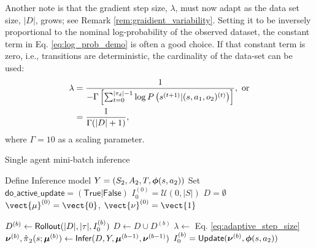 Another note is that the gradient step size, $\lambda$, must now adapt as the data set size, $|D|$, grows; see Remark
\ref{rem:graidient_variability}. Setting it to be inversely proportional to the nominal log-probability of the observed
dataset, the constant term in Eq. \ref{eq:log_prob_demo} is often a good choice. If that constant term is zero, i.e.,
transitions are deterministic, the cardinality of the data-set can be used:
\begin{equation}\label{eq:adaptive_step_size}
    \begin{aligned}
        \lambda & = \frac{1}{-\Gamma \left[ \sum_{t=0}^{\lvert\tau_d\rvert-1}
                                            \log P \left(s^{(t+1)}|(s, a_1, o_2)^{(t)}\right)\right]},\ \text{or}\\
                & = \frac{1}{\Gamma(|D|+1)},
    \end{aligned}
\end{equation}
where $\Gamma=10$ as a scaling parameter.

        \begin{algorithm}
        \caption{Single agent mini-batch inference}
        \label{alg:single_agent_batch}
        \begin{algorithmic}[1]
                \State Define Inference model $Y=(S_2,A_2,T,\boldsymbol{\mathbb{\phi}}(s, a_2))$
                \State Set $\mathsf{do\_active\_update}=(\mathsf{True}|\mathsf{False})$
                \State $I_0^{(0)} = \mathcal{U}(0,|S|)$
                \State $D=\emptyset$ 
                \State $\vect{\mu}^{(0)} = \vect{0}$, $\vect{\nu}^{(0)} = \vect{1}$

                \State $D^{(b)} \leftarrow \mathsf{Rollout}(|D|,|\tau|,I_0^{(b)})$
                \State $D \leftarrow D \cup D^{(b)}$
                \State $\lambda \leftarrow $ Eq. \ref{eq:adaptive_step_size}
                \State
                $\boldsymbol{\mathbb{\nu}}^{(b)} , \hat{\pi_{}}_2(s;\boldsymbol{\mathbb{\mu}}^{(b)})
                \leftarrow \mathsf{Infer}(D,Y,\boldsymbol{\mathbb{\mu}}^{(b-1)}, \boldsymbol{\mathbb{\nu}}^{(b-1)} )$
                \State $I_0^{(b)} = \mathsf{Update}(\boldsymbol{\mathbb{\nu}}^{(b)}, \boldsymbol{\mathbb{\phi}}(s, a_2))$
                \EndIf
                \EndFor
        \end{algorithmic}
\end{algorithm}

